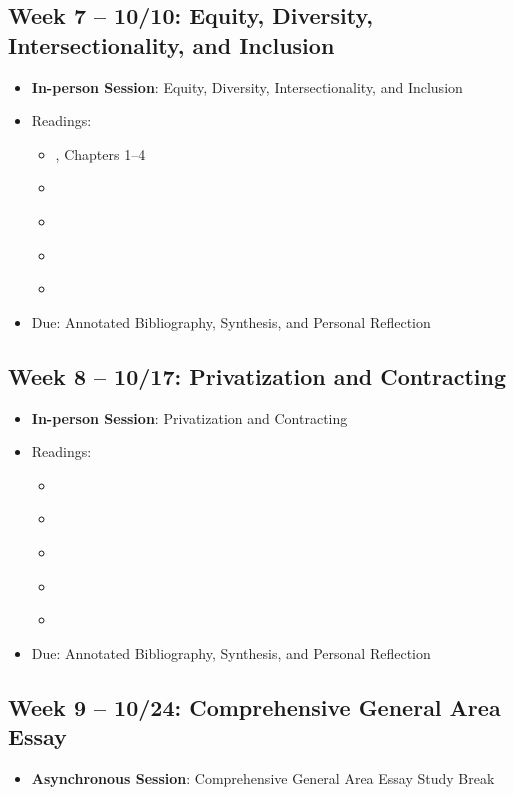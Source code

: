 \documentclass[12pt, letterpaper]{article}
\begin{document}
\subsection*{Week 7 -- 10/10: Equity, Diversity, Intersectionality, and Inclusion}
\begin{itemize}
    \item \textbf{In-person Session}: Equity, Diversity, Intersectionality, and Inclusion
    \item Readings:
    \begin{itemize}
        \item \cite{Gooden2014}, Chapters 1--4
        \item \cite{mccandless2022}
        \item \cite{jiang2022}
        \item \cite{marvel2015}
        \item \cite{Robles2023}
    \end{itemize}
    \item Due: Annotated Bibliography, Synthesis, and Personal Reflection
\end{itemize}

\subsection*{Week 8 -- 10/17: Privatization and Contracting}
\begin{itemize}
    \item \textbf{In-person Session}: Privatization and Contracting
    \item Readings:
    \begin{itemize}
         \item \cite{brown2016} 
         \item \cite{Cohen2008} 
         \item \cite{Hefetz2014} 
         \item \cite{jos2009} 
         \item \cite{lamothe2012}
    \end{itemize}   
    \item Due: Annotated Bibliography, Synthesis, and Personal Reflection
\end{itemize}

\subsection*{Week 9 -- 10/24: Comprehensive General Area Essay}
\begin{itemize}
    \item \textbf{Asynchronous Session}: Comprehensive General Area Essay Study Break
\end{itemize}
\end{document}
